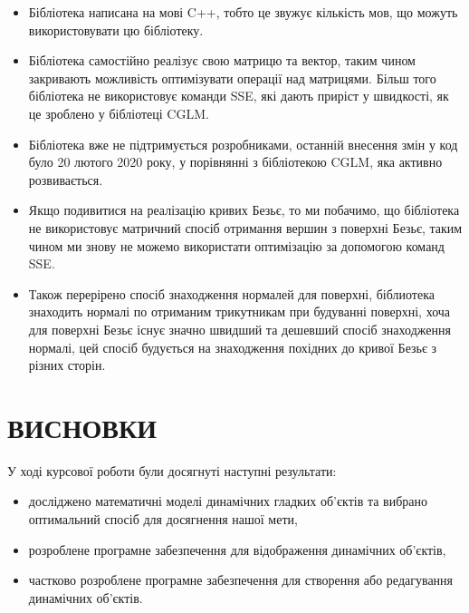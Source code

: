 \documentclass[14pt,a4paper]{extarticle}
\theoremstyle{definition}
\begin{document}
\begin{itemize}
\item Бібліотека написана на мові C++, тобто це звужує кількість мов, що можуть використовувати цю бібліотеку.
\item Бібліотека самостійно реалізує свою матрицю та вектор, таким чином закривають можливість оптимізувати операції над матрицями. Більш того бібліотека не  використовує команди SSE, які дають приріст у швидкості, як це зроблено у бібліотеці CGLM.
\item Бібліотека вже не підтримується розробниками, останній внесення змін у код було 20 лютого 2020 року, у порівнянні з бібліотекою CGLM, яка активно розвивається.
\item Якщо подивитися на реалізацію кривих Безьє, то ми побачимо, що бібліотека не використовує матричний спосіб отримання вершин з поверхні Безьє, таким чином ми знову не можемо використати оптимізацію за допомогою команд SSE.
\item Також перерірено спосіб знаходження нормалей для поверхні, біблиотека знаходить нормалі по отриманим трикутникам при будуванні поверхні, хоча для поверхні Безьє існує значно швидший та дешевший спосіб знаходження нормалі, цей спосіб будується на знаходження похідних до кривої Безьє з різних сторін.
\end{itemize}





\section*{ВИСНОВКИ}
У ході курсової роботи були досягнуті наступні результати:

\begin{itemize}
\item досліджено математичні моделі динамічних гладких об'єктів та вибрано оптимальний спосіб для досягнення нашої мети,
\item розроблене програмне забезпечення для відображення динамічних об'єктів,
\item частково розроблене програмне забезпечення для створення або редагування динамічних об'єктів.
\end{itemize}
\end{document}
